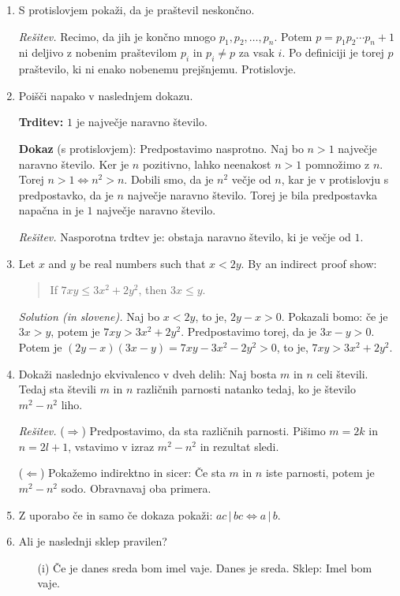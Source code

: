 \documentclass[11pt,paper=b5,footinclude,headinclude]{scrbook} %
\theoremstyle{remark}
\theoremstyle{definition} %
\theoremstyle{theorem} %
\begin{document}
\begin{enumerate}
\item S protislovjem pokaži, da je praštevil neskončno.

\emph{ Rešitev.} Recimo, da jih je končno mnogo $p_1,p_2,\ldots, p_n$. Potem  $p=p_1p_2\cdots p_n+1$ ni deljivo z nobenim praštevilom $p_i$ in $p_i\neq p$ za vsak $i$. Po definiciji je torej $p$ praštevilo, ki ni enako nobenemu prejšnjemu. Protislovje.

\item Poišči napako v naslednjem dokazu. 

\textbf{Trditev:} $1$ je največje naravno število. 

\textbf{Dokaz} (s protislovjem):
Predpostavimo nasprotno. Naj bo $n>1$ največje naravno število. Ker je $n$ pozitivno, lahko neenakost $n>1$ pomnožimo z $n$. Torej $n>1\Leftrightarrow n^2>n$. Dobili smo, da je $n^2$ večje od $n$, kar je v protislovju s predpostavko, da je $n$ največje naravno število. Torej je bila predpostavka napačna in je $1$ največje naravno število.

\emph{ Rešitev.} Nasporotna trdtev je: obstaja naravno število, ki je večje od $1$.


\item Let  $x$ and $y$ be real numbers such that $x<2y$. 
By an indirect proof show: 
\begin{quote}
    If $7xy\leq 3x^2 + 2y^2$, then $3x\leq y$.
\end{quote}

\emph{ Solution (in slovene).} Naj bo $x<2y$, to je, $2y-x>0$. Pokazali bomo: če je $3x> y$, potem je $7xy > 3x^2 + 2y^2$. Predpostavimo torej, da je $3x-y>0$. Potem je $(2y-x)(3x-y)= 7xy - 3x^2 - 2y^2>0$, to je, $7xy > 3x^2 + 2y^2$.

\item Dokaži naslednjo ekvivalenco v dveh delih: Naj bosta $m$ in $n$ celi števili. Tedaj sta števili $m$ in $n$ različnih parnosti natanko tedaj, ko je število $m^2- n^2$ liho.

\emph{ Rešitev.} ($\Rightarrow$) Predpostavimo, da sta različnih parnosti. Pišimo  $m=2k$ in $n=2l+1$, vstavimo v izraz $m^2- n^2$ in rezultat sledi.

($\Leftarrow$) Pokažemo indirektno in sicer: Če sta $m$ in $n$ iste parnosti, potem je $m^2- n^2$ sodo. Obravnavaj oba primera.


\item Z uporabo če in samo če dokaza pokaži: $ac\,|\,bc \Leftrightarrow a\,|\,b$.

\item Ali je naslednji sklep pravilen?
\begin{enumerate}
\item[(i)] Če je danes sreda bom imel vaje. Danes je sreda. Sklep: Imel bom vaje.


\end{enumerate}
\end{enumerate}
\end{document}

